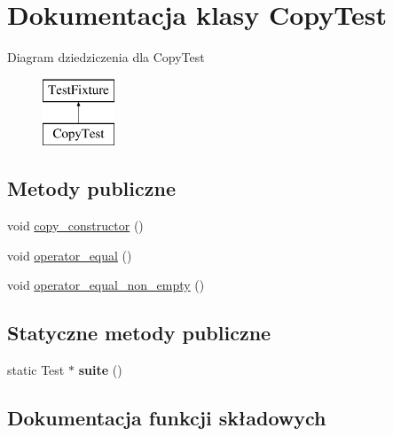 \hypertarget{class_copy_test}{}\section{Dokumentacja klasy Copy\+Test}
\label{class_copy_test}
Diagram dziedziczenia dla Copy\+Test\begin{figure}[H]
\begin{center}
\leavevmode
\includegraphics[height=2.000000cm]{class_copy_test}
\end{center}
\end{figure}
\subsection*{Metody publiczne}
\begin{DoxyCompactItemize}
\item 
void \hyperlink{class_copy_test_a753620e968ee6ac627e4e65ad139a54f}{copy\+\_\+constructor} ()
\item 
void \hyperlink{class_copy_test_aea0770d1ee3defbee564d72a7d3d9a44}{operator\+\_\+equal} ()
\item 
void \hyperlink{class_copy_test_a37811781b4c94cc5414b236290aae0d0}{operator\+\_\+equal\+\_\+non\+\_\+empty} ()
\end{DoxyCompactItemize}
\subsection*{Statyczne metody publiczne}
\begin{DoxyCompactItemize}
\item 
\mbox{\label{class_copy_test_a9b9f546e882227c85841847274037bf4}} 
static Test $\ast$ {\bfseries suite} ()
\end{DoxyCompactItemize}


\subsection{Dokumentacja funkcji składowych}
\mbox{\label{class_copy_test_a753620e968ee6ac627e4e65ad139a54f}} 
